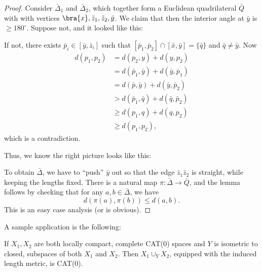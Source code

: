\documentclass[a4paper]{article}
\begin{document}
\begin{proof}
  Consider $\bar{\Delta}_1$ and $\bar{\Delta}_2$, which together form a Euclidean quadrilateral $\bar{Q}$ with with vertices $\bra{x}, \bar{z}_1, \bar{z}_2, \bar{y}$. We claim that then the interior angle at $\bar{y}$ is $\geq 180^\circ$. Suppose not, and it looked like this:
  \begin{center}
  \end{center}
  If not, there exists $\bar{p}_i \in [\bar{y}, \bar{z}_i]$ such that $[\bar{p}_1, \bar{p}_2] \cap [\bar{x}, \bar{y}] = \{\bar{q}\}$ and $\bar{q} \not= \bar{y}$. Now
  \begin{align*}
    d(p_1, p_2) &= d(p_2, y) + d(y, p_2) \\
    &= d(\bar{p}_1, \bar{y}) + d(\bar{y}, \bar{p}_1)\\
    &= d(\bar{p}, \bar{y}) + d(\bar{y}, \bar{p}_2)\\
    &> d(\bar{p}_1, \bar{q}) + d(\bar{q}, \bar{p}_2)\\
    &\geq d(p_1, q) + d(q, p_2)\\
    &\geq d(p_1, p_2),
  \end{align*}
  which is a contradiction.

  Thus, we know the right picture looks like this:
  \begin{center}
  \end{center}
  To obtain $\bar{\Delta}$, we have to ``push'' $\bar{y}$ out so that the edge $\bar{z}_1 \bar{z}_2$ is straight, while keeping the lengths fixed. There is a natural map $\pi: \bar{\Delta} \to \bar{Q}$, and the lemma follows by checking that for any $a, b \in \bar{\Delta}$, we have
  \[
    d(\pi(a), \pi(b)) \leq d(a, b).
  \]
  This is an easy case analysis (or is obvious).
\end{proof}

A sample application is the following:
\begin{prop}
  If $X_1, X_2$ are both locally compact, complete CAT(0) spaces and $Y$ is isometric to closed, subspaces of both $X_1$ and $X_2$. Then $X_1 \cup_Y X_2$, equipped with the induced length metric, is CAT(0).
\end{prop}
\end{document}
